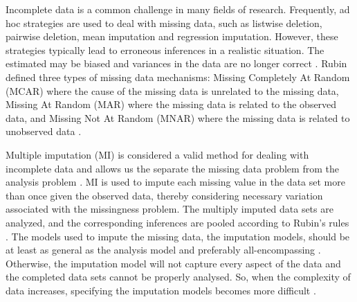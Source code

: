 \documentclass[10pt, a4paper, titlepage]{article}
\begin{document}
Incomplete data is a common challenge in many fields of research. Frequently, ad hoc strategies are used to deal with missing data, such as listwise deletion, pairwise deletion, mean imputation and regression imputation. However, these strategies typically lead to erroneous inferences in a realistic situation. The estimated may be biased and variances in the data are no longer correct \citep{buurenFlexibleImputationMissing2018, kang2013, enders2017, austin2021}. Rubin defined three types of missing data mechanisms: Missing Completely At Random (MCAR) where the cause of the missing data is unrelated to the missing data, Missing At Random (MAR) where the missing data is related to the observed data, and Missing Not At Random (MNAR) where the missing data is related to unobserved data \citep{rubin1976}.

Multiple imputation (MI) is considered a valid method for dealing with incomplete data and allows us the separate the missing data problem from the analysis problem \citep{mistlerComparisonJointModel2017, buurenFlexibleImputationMissing2018, enders2017, burgette2010, austin2021, audigier2018, vanbuuren2007, grund2021, hughes2014}. MI is used to impute each missing value in the data set more than once given the observed data, thereby considering necessary variation associated with the missingness problem. The multiply imputed data sets are analyzed, and the corresponding inferences are pooled according to Rubin's rules \citep{buurenFlexibleImputationMissing2018, austin2021, rubin1987, carpenter2013}. The models used to impute the missing data, the imputation models, should be at least as general as the analysis model and preferably all-encompassing \citep{grund2018, enders2018, meng1994multiple, bartlett2015, grund2016}. Otherwise, the imputation model will not capture every aspect of the data and the completed data sets cannot be properly analysed. So, when the complexity of data increases, specifying the imputation models becomes more difficult \citep{grund2018, buurenFlexibleImputationMissing2018}.
\end{document}
